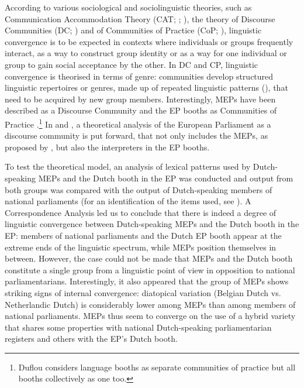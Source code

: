 \documentclass[output=paper]{langscibook}
\begin{document}
According to various sociological and sociolinguistic theories, such as Communication Accommodation Theory (CAT; \citealt{Giles1973}; \citealt{GilesOgay2007}), the theory of Discourse Communities (DC; \citealt{Swales1990}) and of Communities of Practice (CoP; \citealt{Wenger1998}), linguistic convergence is to be expected in contexts where individuals or groups frequently interact, as a way to construct group identity or as a way for one individual or group to gain social acceptance by the other. In DC and CP, linguistic convergence is theorised in terms of genre: communities develop structured linguistic repertoires or genres, made up of repeated linguistic patterns (\citealt{MillerKelley2016}), that need to be acquired by new group members. Interestingly, MEPs have been described as a Discourse Community \citep{CalzadaPerez2007} and the EP booths as Communities of Practice \citep{Duflou2016}.\footnote{Duflou considers language booths as separate communities of practice but all booths collectively as one too.} In \citet{Defrancq2018} and \citet{DefrancqPlevoetsforthcoming}, a theoretical analysis of the European Parliament as a discourse community is put forward, that not only includes the MEPs, as proposed by \citet{CalzadaPerez2007}, but also the interpreters in the EP booths.  

To test the theoretical model, an analysis of lexical patterns used by Dutch-speaking MEPs and the Dutch booth in the EP was conducted \citep{DefrancqPlevoetsforthcoming} and output from both groups was compared with the output of Dutch-speaking members of national parliaments (for an identification of the items used, see ). A Correspondence Analysis led us to conclude that there is indeed a degree of linguistic convergence between Dutch-speaking MEPs and the Dutch booth in the EP: members of national parliaments and the Dutch EP booth appear at the extreme ends of the linguistic spectrum, while MEPs position themselves in between. However, the case could not be made that MEPs and the Dutch booth constitute a single group from a linguistic point of view in opposition to national parliamentarians. Interestingly, it also appeared that the group of MEPs shows striking signs of internal convergence: diatopical variation (Belgian Dutch vs. Netherlandic Dutch) is considerably lower among MEPs than among members of national parliaments. MEPs thus seem to converge on the use of a hybrid variety that shares some properties with national Dutch-speaking parliamentarian registers and others with the EP’s Dutch booth.
\end{document}

